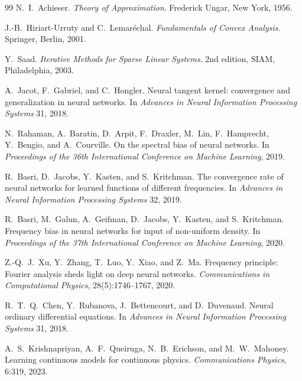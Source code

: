 \documentclass[11pt]{article}
\theoremstyle{definition}
\theoremstyle{remark}
\begin{document}
\begin{thebibliography}{99}
N.~I.~Achieser.
\emph{Theory of Approximation}.
Frederick Ungar, New York, 1956.

J.-B.~Hiriart-Urruty and C.~Lemar\'echal.
\emph{Fundamentals of Convex Analysis}.
Springer, Berlin, 2001.

Y.~Saad.
\emph{Iterative Methods for Sparse Linear Systems}.
2nd edition, SIAM, Philadelphia, 2003.

A.~Jacot, F.~Gabriel, and C.~Hongler.
Neural tangent kernel: convergence and generalization in neural networks.
In \emph{Advances in Neural Information Processing Systems} 31, 2018.

N.~Rahaman, A.~Baratin, D.~Arpit, F.~Draxler, M.~Lin, F.~Hamprecht, Y.~Bengio, and A.~Courville.
On the spectral bias of neural networks.
In \emph{Proceedings of the 36th International Conference on Machine Learning}, 2019.

R.~Basri, D.~Jacobs, Y.~Kasten, and S.~Kritchman.
The convergence rate of neural networks for learned functions of different frequencies.
In \emph{Advances in Neural Information Processing Systems} 32, 2019.

R.~Basri, M.~Galun, A.~Geifman, D.~Jacobs, Y.~Kasten, and S.~Kritchman.
Frequency bias in neural networks for input of non-uniform density.
In \emph{Proceedings of the 37th International Conference on Machine Learning}, 2020.

Z.-Q.~J.~Xu, Y.~Zhang, T.~Luo, Y.~Xiao, and Z.~Ma.
Frequency principle: Fourier analysis sheds light on deep neural networks.
\emph{Communications in Computational Physics}, 28(5):1746--1767, 2020.

R.~T.~Q.~Chen, Y.~Rubanova, J.~Bettencourt, and D.~Duvenaud.
Neural ordinary differential equations.
In \emph{Advances in Neural Information Processing Systems} 31, 2018.

A.~S.~Krishnapriyan, A.~F.~Queiruga, N.~B.~Erichson, and M.~W.~Mahoney.
Learning continuous models for continuous physics.
\emph{Communications Physics}, 6:319, 2023.
\end{thebibliography}
\end{document}
